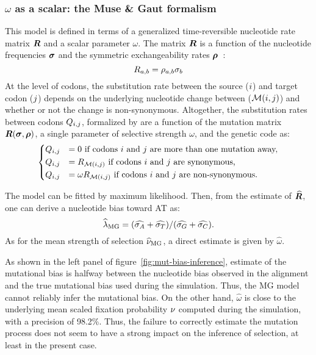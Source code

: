 \subsubsection{\texorpdfstring{$\omega$}{ω} as a scalar: the Muse \& Gaut formalism}
This model is defined in terms of a generalized time-reversible nucleotide rate matrix $\bm{R}$ and a scalar parameter $\omega$.
The matrix $\bm{R}$ is a function of the nucleotide frequencies $\bm{\sigma}$ and the symmetric exchangeability rates $\bm{\rho}$~\citep{Tavare1986}:
\begin{equation}
    R_{a, b} = \rho_{a,b}\sigma_b
\end{equation}
At the level of codons, the substitution rate between the source (${i}$) and target codon (${j}$) depends on the underlying nucleotide change between ($\mathcal{M}({i}, {j})$) and whether or not the change is non-synonymous.
Altogether, the substitution rates between codons $Q_{{i}, {j}}$, formalized by \citet{Muse1994} are a function of the mutation matrix $\bm{R}(\bm{\sigma}, \bm{\rho})$, a single parameter of selective strength $\omega$, and the genetic code as:
\begin{equation}
    \begin{dcases}
        Q_{{i}, {j}} & = 0 \text{ if codons ${i}$ and ${j}$ are more than one mutation away,} \\
        Q_{{i}, {j}} & = R_{\mathcal{M}({i}, {j})} \text{ if codons ${i}$ and ${j}$ are synonymous,} \\
        Q_{{i}, {j}} & = \omega R_{\mathcal{M}({i}, {j})} \text{ if codons ${i}$ and ${j}$ are non-synonymous}.
    \end{dcases}
    \label{eq:codon-muse-gaut}
\end{equation}

The model can be fitted by maximum likelihood.
Then, from the estimate of $\widehat{\bm{R}}$, one can derive a nucleotide bias toward AT as:
\begin{equation}
    \widehat{\lambda}_{\text{MG}} = (\widehat{\sigma_A} +\widehat{\sigma_T}) /(\widehat{\sigma_G} +\widehat{\sigma_C}).\label{eq:lambda-R}
\end{equation}
As for the mean strength of selection $\widehat{\nu}_{\text{MG}}$, a direct estimate is given by $\widehat{\omega}$.

As shown in the left panel of figure~\ref{fig:mut-bias-inference}, estimate of the mutational bias is halfway between the nucleotide bias observed in the alignment and the true mutational bias used during the simulation.
Thus, the MG model cannot reliably infer the mutational bias.
On the other hand, $\widehat{\omega}$ is close to the underlying mean scaled fixation probability $\nu$ computed during the simulation, with a precision of 98.2\%.
Thus, the failure to correctly estimate the mutation process does not seem to have a strong impact on the inference of selection, at least in the present case.

